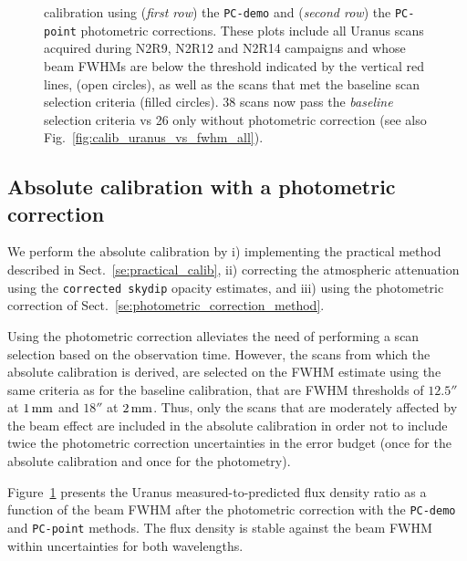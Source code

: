 \begin{figure}[!htbp]
\begin{center}
{{      calibration using (\emph{first row}) the {\tt PC-demo} and (\emph{second
        row}) the {\tt PC-point} photometric corrections. These plots
      include all Uranus scans acquired during N2R9, N2R12 and N2R14
      campaigns and whose beam FWHMs are below the threshold indicated
      by the vertical red lines, (open circles), as
      well as the scans that met the baseline scan selection criteria (filled
      circles). 38 scans now pass the \emph{baseline} selection criteria vs 26
      only without photometric correction (see also Fig.~\ref{fig:calib_uranus_vs_fwhm_all}).}}
\label{fig:calib_uranus_vs_fwhm_photocorr}
\end{center}
\end{figure}

\subsection{Absolute calibration with a photometric correction}

We perform the absolute calibration by i) implementing the practical
method described in Sect.~\ref{se:practical_calib}, ii) correcting the
atmospheric attenuation using the {\tt corrected skydip} opacity
estimates, and iii) using the photometric correction of
Sect.~\ref{se:photometric_correction_method}.

Using the photometric correction alleviates the need of
performing a scan selection based on the observation time. However,
the scans from which the absolute calibration is derived, are selected
on the FWHM estimate using the same criteria as for the baseline
calibration, that are FWHM thresholds of $12.5''$ at $1\, \rm{mm}$ and $18''$ at
$2\, \rm{mm}$. Thus, only the scans that are moderately affected by the beam
effect are included in the absolute calibration in order not to
include twice the photometric correction uncertainties in the error
budget (once for the absolute calibration and once for the photometry).

Figure~\ref{fig:calib_uranus_vs_fwhm_photocorr} presents the Uranus
measured-to-predicted flux density ratio as a function of the beam FWHM
after the photometric correction with the {\tt PC-demo} and
{\tt PC-point} methods. The flux
density is stable against the beam FWHM within uncertainties for both
wavelengths.

